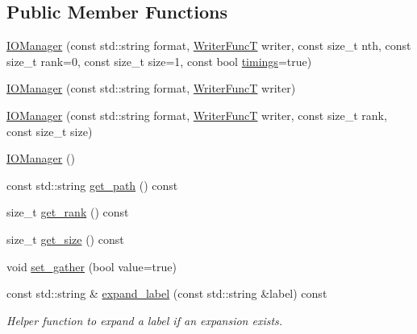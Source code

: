 \subsection*{Public Member Functions}
\begin{DoxyCompactItemize}
\item 
\mbox{\hyperlink{classwash_1_1io_1_1IOManager_acea5f3f8a7f3e8eb1bfda9bc551b8435}{I\+O\+Manager}} (const std\+::string format, \mbox{\hyperlink{classwash_1_1io_1_1IOManager_aeda8c39a8e3c748efd1b3e0f8ae823ee}{Writer\+FuncT}} writer, const size\+\_\+t nth, const size\+\_\+t rank=0, const size\+\_\+t size=1, const bool \mbox{\hyperlink{namespacewash_a40aed5edcd0e0403841e3f83eaa41965}{timings}}=true)
\item 
\mbox{\hyperlink{classwash_1_1io_1_1IOManager_a736c595ca08833f2a4df8f0db90ceb28}{I\+O\+Manager}} (const std\+::string format, \mbox{\hyperlink{classwash_1_1io_1_1IOManager_aeda8c39a8e3c748efd1b3e0f8ae823ee}{Writer\+FuncT}} writer)
\item 
\mbox{\hyperlink{classwash_1_1io_1_1IOManager_af011701d8fed420a51bafe7fcf035774}{I\+O\+Manager}} (const std\+::string format, \mbox{\hyperlink{classwash_1_1io_1_1IOManager_aeda8c39a8e3c748efd1b3e0f8ae823ee}{Writer\+FuncT}} writer, const size\+\_\+t rank, const size\+\_\+t size)
\item 
\mbox{\hyperlink{classwash_1_1io_1_1IOManager_a2abea2ab5058a02b4bcf0876c0e179f7}{I\+O\+Manager}} ()
\item 
const std\+::string \mbox{\hyperlink{classwash_1_1io_1_1IOManager_aded7d1dbc7a4c2fc21e3a914ea0ea3b0}{get\+\_\+path}} () const
\item 
size\+\_\+t \mbox{\hyperlink{classwash_1_1io_1_1IOManager_ad290bc39e3c9ccafb070bf6ba75597b6}{get\+\_\+rank}} () const
\item 
size\+\_\+t \mbox{\hyperlink{classwash_1_1io_1_1IOManager_a01f3e40f12375f3128ad9b19f3ecda12}{get\+\_\+size}} () const
\item 
void \mbox{\hyperlink{classwash_1_1io_1_1IOManager_ab599141d728a1d6c09ce273a9e556eff}{set\+\_\+gather}} (bool value=true)
\item 
const std\+::string \& \mbox{\hyperlink{classwash_1_1io_1_1IOManager_ac0942e50fcd001ef853c8eb6b107e92d}{expand\+\_\+label}} (const std\+::string \&label) const
\begin{DoxyCompactList}\small\item\em Helper function to expand a label if an expansion exists. \end{DoxyCompactList}\item 

\end{DoxyCompactItemize}
